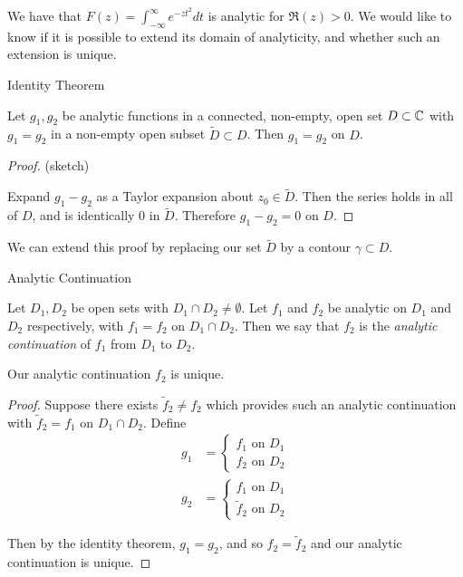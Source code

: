\documentclass[a4paper]{article}
\begin{document}
We have that  $F(z) = \int_{-\infty}^{\infty} e^{-zt^2}dt$ is analytic for $\Re(z) > 0.$ We would like to know if it is possible to extend its domain of analyticity, and whether such an extension is unique.

\begin{thm} Identity Theorem
	
	Let $g_1, g_2$ be analytic functions in a connected, non-empty, open set $D \subset \mathbb{C}$ with $g_1 = g_2$ in a non-empty open subset $\tilde{D} \subset D$. Then $g_1 = g_2$ on $D$.

\end{thm}

\begin{proof} (sketch)

Expand $g_1 - g_2$ as a Taylor expansion about $z_0 \in \tilde{D}$. Then the series holds in all of $D$, and is identically $0$ in $\tilde{D}$. Therefore  $g_1-g_2 = 0$ on $D$. 
\end{proof}
We can extend this proof by replacing our set $\tilde{D}$ by a contour $\gamma \subset D$.

\begin{defn} Analytic Continuation

	Let $D_1, D_2$ be open sets with $D_1 \cap D_2 \neq \emptyset$. Let $f_1$ and $f_2$ be analytic on $D_1$ and $D_2$ respectively, with $f_1 = f_2$ on $D_1 \cap D_2$. Then we say that $f_2$ is the \textit{analytic continuation} of $f_1$ from $D_1$ to $D_2$.
\end{defn}

\begin{prop}
	Our analytic continuation $f_2$ is unique.
\end{prop}

\begin{proof}
	Suppose there exists  $\tilde{f}_2 \neq f_2$ which provides such an analytic continuation with $\tilde{f}_2 = f_1$ on $D_1 \cap D_2$. Define
	\begin{align*}
		g_1 &= \begin{cases}
		f_1 \text{ on } D_1 \\
		f_2 \text{ on } D_2
	\end{cases} \\
	g_2 &= \begin{cases}
		f_1 \text{ on } D_1 \\
		\tilde{f}_2 \text{ on } D_2
	\end{cases}
\end{align*}

Then by the identity theorem, $g_1 = g_2$, and so $f_2 = \tilde{f}_2$ and our analytic continuation is unique. 
\end{proof}
\end{document}
